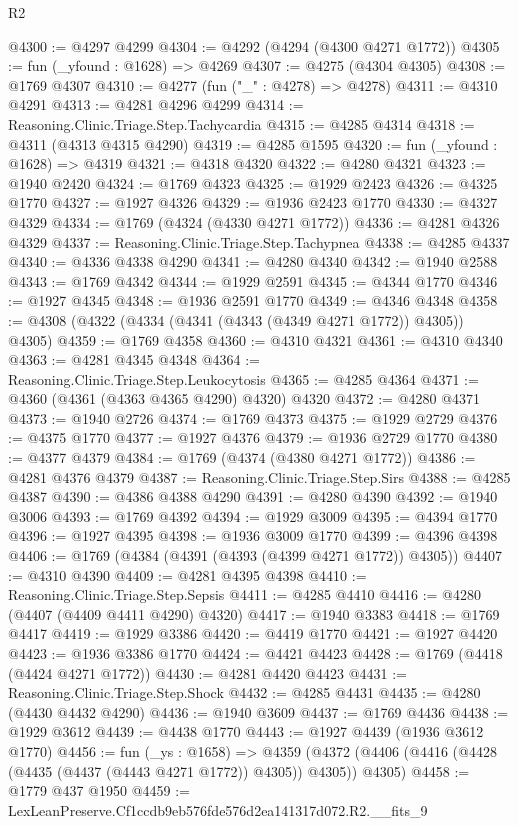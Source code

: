 \begin{lexlean}{R2}
\begin{coremodule}
@4300 := @4297 @4299
@4304 := @4292 (@4294 (@4300 @4271 @1772))
@4305 := fun (_yfound : @1628) => @4269
@4307 := @4275 (@4304 @4305)
@4308 := @1769 @4307
@4310 := @4277 (fun ("_" : @4278) => @4278)
@4311 := @4310 @4291
@4313 := @4281 @4296 @4299
@4314 := Reasoning.Clinic.Triage.Step.Tachycardia
@4315 := @4285 @4314
@4318 := @4311 (@4313 @4315 @4290)
@4319 := @4285 @1595
@4320 := fun (_yfound : @1628) => @4319
@4321 := @4318 @4320
@4322 := @4280 @4321
@4323 := @1940 @2420
@4324 := @1769 @4323
@4325 := @1929 @2423
@4326 := @4325 @1770
@4327 := @1927 @4326
@4329 := @1936 @2423 @1770
@4330 := @4327 @4329
@4334 := @1769 (@4324 (@4330 @4271 @1772))
@4336 := @4281 @4326 @4329
@4337 := Reasoning.Clinic.Triage.Step.Tachypnea
@4338 := @4285 @4337
@4340 := @4336 @4338 @4290
@4341 := @4280 @4340
@4342 := @1940 @2588
@4343 := @1769 @4342
@4344 := @1929 @2591
@4345 := @4344 @1770
@4346 := @1927 @4345
@4348 := @1936 @2591 @1770
@4349 := @4346 @4348
@4358 := @4308 (@4322 (@4334 (@4341 (@4343 (@4349 @4271 @1772)) @4305)) @4305)
@4359 := @1769 @4358
@4360 := @4310 @4321
@4361 := @4310 @4340
@4363 := @4281 @4345 @4348
@4364 := Reasoning.Clinic.Triage.Step.Leukocytosis
@4365 := @4285 @4364
@4371 := @4360 (@4361 (@4363 @4365 @4290) @4320) @4320
@4372 := @4280 @4371
@4373 := @1940 @2726
@4374 := @1769 @4373
@4375 := @1929 @2729
@4376 := @4375 @1770
@4377 := @1927 @4376
@4379 := @1936 @2729 @1770
@4380 := @4377 @4379
@4384 := @1769 (@4374 (@4380 @4271 @1772))
@4386 := @4281 @4376 @4379
@4387 := Reasoning.Clinic.Triage.Step.Sirs
@4388 := @4285 @4387
@4390 := @4386 @4388 @4290
@4391 := @4280 @4390
@4392 := @1940 @3006
@4393 := @1769 @4392
@4394 := @1929 @3009
@4395 := @4394 @1770
@4396 := @1927 @4395
@4398 := @1936 @3009 @1770
@4399 := @4396 @4398
@4406 := @1769 (@4384 (@4391 (@4393 (@4399 @4271 @1772)) @4305))
@4407 := @4310 @4390
@4409 := @4281 @4395 @4398
@4410 := Reasoning.Clinic.Triage.Step.Sepsis
@4411 := @4285 @4410
@4416 := @4280 (@4407 (@4409 @4411 @4290) @4320)
@4417 := @1940 @3383
@4418 := @1769 @4417
@4419 := @1929 @3386
@4420 := @4419 @1770
@4421 := @1927 @4420
@4423 := @1936 @3386 @1770
@4424 := @4421 @4423
@4428 := @1769 (@4418 (@4424 @4271 @1772))
@4430 := @4281 @4420 @4423
@4431 := Reasoning.Clinic.Triage.Step.Shock
@4432 := @4285 @4431
@4435 := @4280 (@4430 @4432 @4290)
@4436 := @1940 @3609
@4437 := @1769 @4436
@4438 := @1929 @3612
@4439 := @4438 @1770
@4443 := @1927 @4439 (@1936 @3612 @1770)
@4456 := fun (_ys : @1658) =>
  @4359 (@4372 (@4406 (@4416 (@4428 (@4435 (@4437 (@4443 @4271 @1772)) @4305)) @4305)) @4305)
@4458 := @1779 @437 @1950
@4459 := LexLeanPreserve.Cf1ccdb9eb576fde576d2ea141317d072.R2.__fits_9

\end{coremodule}
\end{lexlean}
